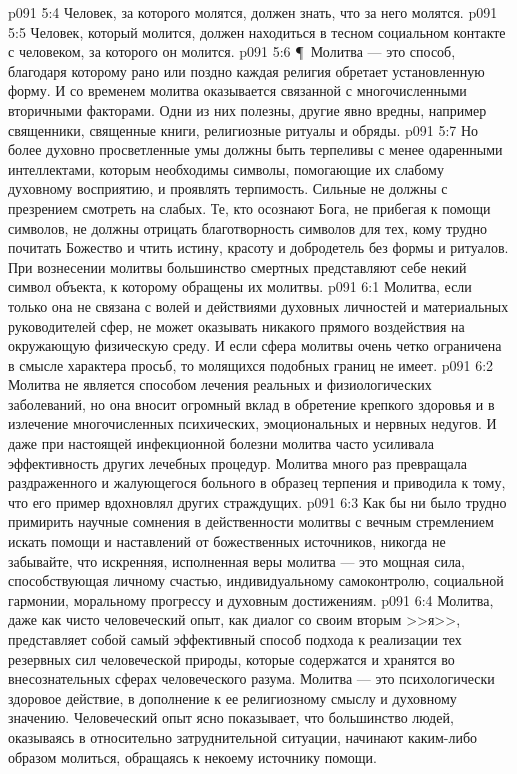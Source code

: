 \vs p091 5:4 \bibnobreakspace Человек, за которого молятся, должен знать, что за него молятся.
\vs p091 5:5 \bibnobreakspace Человек, который молится, должен находиться в тесном социальном контакте с человеком, за которого он молится.
\vs p091 5:6 \P\ Молитва --- это способ, благодаря которому рано или поздно каждая религия обретает установленную форму. И со временем молитва оказывается связанной с многочисленными вторичными факторами. Одни из них полезны, другие явно вредны, например священники, священные книги, религиозные ритуалы и обряды.
\vs p091 5:7 Но более духовно просветленные умы должны быть терпеливы с менее одаренными интеллектами, которым необходимы символы, помогающие их слабому духовному восприятию, и проявлять терпимость. Сильные не должны с презрением смотреть на слабых. Те, кто осознают Бога, не прибегая к помощи символов, не должны отрицать благотворность символов для тех, кому трудно почитать Божество и чтить истину, красоту и добродетель без формы и ритуалов. При вознесении молитвы большинство смертных представляют себе некий символ объекта, к которому обращены их молитвы.
\vs p091 6:1 Молитва, если только она не связана с волей и действиями духовных личностей и материальных руководителей сфер, не может оказывать никакого прямого воздействия на окружающую физическую среду. И если сфера молитвы очень четко ограничена в смысле характера просьб, то  молящихся подобных границ не имеет.
\vs p091 6:2 Молитва не является способом лечения реальных и физиологических заболеваний, но она вносит огромный вклад в обретение крепкого здоровья и в излечение многочисленных психических, эмоциональных и нервных недугов. И даже при настоящей инфекционной болезни молитва часто усиливала эффективность других лечебных процедур. Молитва много раз превращала раздраженного и жалующегося больного в образец терпения и приводила к тому, что его пример вдохновлял других страждущих.
\vs p091 6:3 Как бы ни было трудно примирить научные сомнения в действенности молитвы с вечным стремлением искать помощи и наставлений от божественных источников, никогда не забывайте, что искренняя, исполненная веры молитва --- это мощная сила, способствующая личному счастью, индивидуальному самоконтролю, социальной гармонии, моральному прогрессу и духовным достижениям.
\vs p091 6:4 Молитва, даже как чисто человеческий опыт, как диалог со своим вторым >>я>>, представляет собой самый эффективный способ подхода к реализации тех резервных сил человеческой природы, которые содержатся и хранятся во внесознательных сферах человеческого разума. Молитва --- это психологически здоровое действие, в дополнение к ее религиозному смыслу и духовному значению. Человеческий опыт ясно показывает, что большинство людей, оказываясь в относительно затруднительной ситуации, начинают каким\hyp{}либо образом молиться, обращаясь к некоему источнику помощи.
